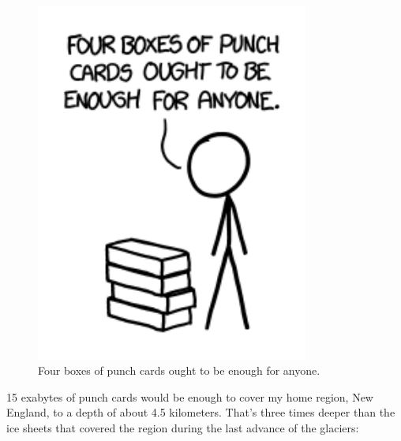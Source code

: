 {\begin{figure}[!htbp]
\centering
\includegraphics[scale=0.5, max width=0.8\textwidth]{imgs/a/63/google_160kb.png}
\caption{Four boxes of punch cards ought to be enough for anyone.}
\end{figure}

{15 exabytes of punch cards would be enough to cover my home region, New England, to a depth of about 4.5 kilometers. That's three times deeper than the ice sheets that covered the region during the last advance of the glaciers:}

}
